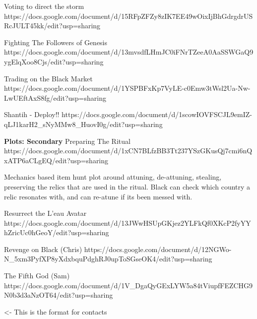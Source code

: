\documentclass[char]{GL2020}
\begin{document}
Voting to direct the storm
https://docs.google.com/document/d/15RFpZFZy8zIK7EE49wOixIjBhGdrgdrUSRcJULT45kk/edit?usp=sharing

Fighting The Followers of Genesis
https://docs.google.com/document/d/13mvsdfLHmJC0iFNrTZeeA0AaSSWGaQ9ygElqXoo8Cjs/edit?usp=sharing

Trading on the Black Market
https://docs.google.com/document/d/1YSPBFxKp7VyLE-c0Emw3tWsl2Ua-Nw-LwUEftAxS8fg/edit?usp=sharing

Shantih - Deploy!!
https://docs.google.com/document/d/1scowIOVFSCJL9emIZ-qLJ1karH2_sNyMMw8_HuovI0g/edit?usp=sharing

\textbf{Plots: Secondary}
Preparing The Ritual 
https://docs.google.com/document/d/1xCN7BLfzBB3Tt237YSzGKusQj7cmi6nQxATP6aCLgEQ/edit?usp=sharing

Mechanics based item hunt plot around attuning, de-attuning, stealing, preserving the relics that are used in the ritual. Black can check which country a relic resonates with, and can re-atune if its been messed with.

Resurrect the L'eau Avatar
https://docs.google.com/document/d/13JWwHSUpGKjez2YLFkQf0XKcP2fyYYhZricUc0hGeoY/edit?usp=sharing

Revenge on Black (Chris)
https://docs.google.com/document/d/12NGWo-N_5xm3PyfXP8yXdxbquPdghRJ0upToSGseOK4/edit?usp=sharing

The Fifth God (Sam)
https://docs.google.com/document/d/1V_DgaQyGExLYW5a84tViupfFEZCHG9N0b3d3aNzOT64/edit?usp=sharing



\begin{itemz}[Goals]
	\item 
\end{itemz}

\begin{itemz}[Notes]
	\item 
\end{itemz}

\begin{contacts}
	\contact{\cTest{}} <- This is the format for contacts 
\end{contacts}
\end{document}
